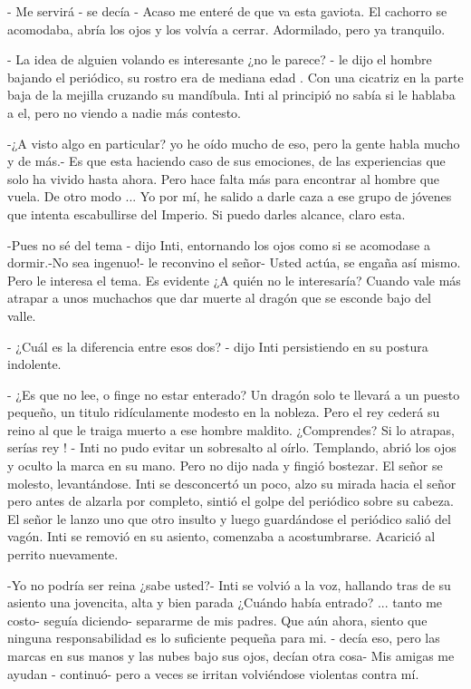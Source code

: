- Me servirá - se decía - Acaso me enteré de que va esta gaviota. El cachorro se acomodaba, abría los ojos y los volvía a cerrar. Adormilado, pero ya tranquilo.

- La idea de alguien volando es interesante ¿no le parece? - le dijo el hombre bajando el periódico, su rostro era de mediana edad . Con una cicatriz en la parte baja de la mejilla cruzando su mandíbula. Inti al principió no sabía si le hablaba a el, pero no viendo a nadie más contesto.

-¿A visto algo en particular? yo he oído mucho de eso, pero la gente habla mucho y de más.- Es que esta haciendo caso de sus emociones, de las experiencias que solo ha vivido hasta ahora. Pero hace falta más para encontrar al hombre que vuela. De otro modo ... Yo por mí, he salido a darle caza a ese grupo de jóvenes que intenta escabullirse del Imperio. Si puedo darles alcance, claro esta.

-Pues no sé del tema - dijo Inti, entornando los ojos como si se acomodase a dormir.-No sea ingenuo!- le reconvino el señor- Usted actúa, se engaña así mismo. Pero le interesa el tema. Es evidente ¿A quién no le interesaría? Cuando vale más atrapar a unos muchachos que dar muerte al dragón que se esconde bajo del valle.

- ¿Cuál es la diferencia entre esos dos? - dijo Inti persistiendo en su postura indolente.

- ¿Es que no lee, o finge no estar enterado? Un dragón solo te llevará a un puesto pequeño, un titulo ridículamente modesto en la nobleza. Pero el rey cederá su reino al que le traiga muerto a ese hombre maldito. ¿Comprendes? Si lo atrapas, serías rey ! - Inti no pudo evitar un sobresalto al oírlo. Templando, abrió los ojos y oculto la marca en su mano. Pero no dijo nada y fingió bostezar. El señor se molesto, levantándose. Inti se desconcertó un poco, alzo su mirada hacia el señor pero antes de alzarla por completo, sintió el golpe del periódico sobre su cabeza. El señor le lanzo uno que otro insulto y luego guardándose el periódico salió del vagón.
Inti se removió en su asiento, comenzaba a acostumbrarse. Acarició al perrito nuevamente.

-Yo no podría ser reina ¿sabe usted?- Inti se volvió a la voz, hallando tras de su asiento una jovencita, alta y bien parada ¿Cuándo había entrado? ... tanto me costo- seguía diciendo- separarme de mis padres. Que aún ahora, siento que ninguna responsabilidad es lo suficiente pequeña para mi. - decía eso, pero las marcas en sus manos y las nubes bajo sus ojos, decían otra cosa- Mis amigas me ayudan - continuó- pero a veces se irritan volviéndose violentas contra mí.


